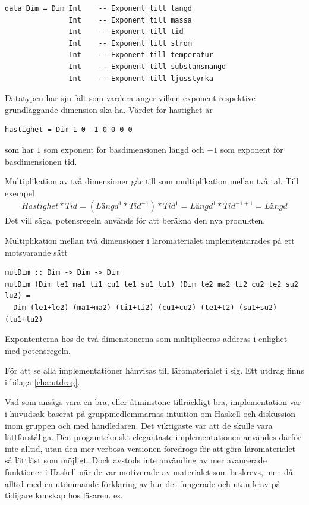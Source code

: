 \begin{draft}
\begin{lstlisting}[frame=none, belowskip=-0.5\baselineskip, xleftmargin=0.5in]
data Dim = Dim Int    -- Exponent till langd
               Int    -- Exponent till massa
               Int    -- Exponent till tid
               Int    -- Exponent till strom
               Int    -- Exponent till temperatur
               Int    -- Exponent till substansmangd
               Int    -- Exponent till ljusstyrka
\end{lstlisting}

Datatypen har sju fält som vardera anger vilken exponent respektive grundläggande dimension ska ha. Värdet för hastighet är

\begin{lstlisting}[frame=none, belowskip=-0.5\baselineskip, xleftmargin=0.5in]
hastighet = Dim 1 0 -1 0 0 0 0
\end{lstlisting}

som har $1$ som exponent för basdimensionen längd och $-1$ som exponent för basdimensionen tid.

Multiplikation av två dimensioner går till som multiplikation mellan två tal. Till exempel
\begin{align*}
  Hastighet * Tid = (Längd^1 * Tid^{-1}) * Tid^1 = Längd^1 * Tid^{-1 + 1} = Längd
\end{align*}
Det vill säga, potensregeln används för att beräkna den nya produkten.

Multiplikation mellan två dimensioner i läromaterialet implemtentarades på ett motsvarande sätt

\begin{lstlisting}[frame=none, belowskip=-0.5\baselineskip, xleftmargin=0.5in]
mulDim :: Dim -> Dim -> Dim
mulDim (Dim le1 ma1 ti1 cu1 te1 su1 lu1) (Dim le2 ma2 ti2 cu2 te2 su2 lu2) =
  Dim (le1+le2) (ma1+ma2) (ti1+ti2) (cu1+cu2) (te1+t2) (su1+su2) (lu1+lu2)
\end{lstlisting}

Expontenterna hos de två dimensionerna som multipliceras adderas i enlighet med potensregeln.

För att se alla implementationer hänvisas till läromaterialet i sig. Ett utdrag finns i bilaga \ref{cha:utdrag}.

Vad som ansågs vara en bra, eller åtminstone tillräckligt bra, implementation var i huvudsak baserat på gruppmedlemmarnas intuition om Haskell och diskussion inom gruppen och med handledaren. Det viktigaste var att de skulle vara lättförståliga. Den progamtekniskt elegantaste implementationen användes därför inte alltid, utan den mer verbosa versionen föredrogs för att göra läromaterialet så lättläst som möjligt. Dock avstods inte använding av mer avancerade funktioner i Haskell när de var motiverade av materialet som beskrevs, men då alltid med en utömmande förklaring av hur det fungerade och utan krav på tidigare kunskap hos läsaren.
es.


\end{draft}
